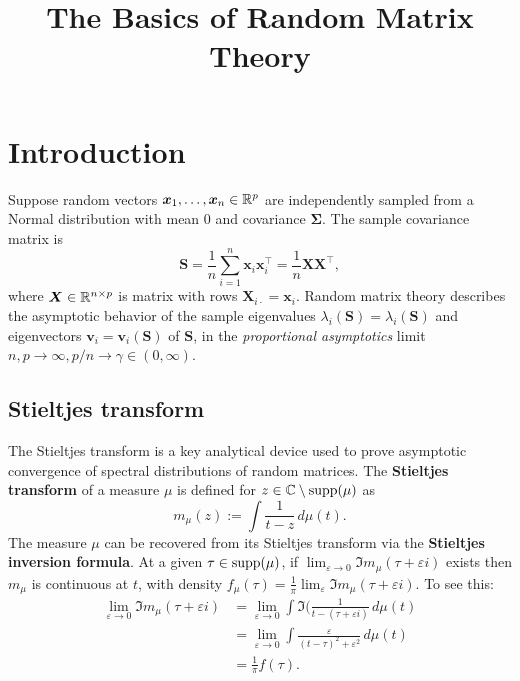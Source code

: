 \documentclass{article}
\title{ {\bf The Basics of Random Matrix Theory} }
\newcommand{\bx}{\boldsymbol{x}}
\newcommand{\bv}{\boldsymbol{v}}
\newcommand{\bX}{\boldsymbol{X}}
\newcommand{\bSigma}{\boldsymbol{\Sigma}}
\newcommand{\bS}{\boldsymbol{S}}
\begin{document}
	
\maketitle
\RaggedRight


\section{Introduction}

Suppose random vectors $\bx_1,\ldots,\bx_n \in \Reals^p$ are independently sampled from a Normal distribution with mean $0$ and covariance $\bSigma$. The sample covariance matrix is
$$
\bS = \frac{1}{n}\sum_{i = 1}^{n} \bx_i \bx_i^{\top} = \frac{1}{n}\bX \bX^{\top},
$$ 
where $\bX \in \Reals^{n \times p}$ is matrix with rows $\bX_{i\cdot} = \bx_i$. Random matrix theory describes the asymptotic behavior of the sample eigenvalues $\lambda_i(\bS) = \lambda_i(\bS)$ and eigenvectors $\bv_i = \bv_i(\bS)$ of $\bS$, in the \emph{proportional asymptotics} limit $n,p \to \infty, p/n \to \gamma \in (0,\infty)$. 

\subsection{Stieltjes transform}
The Stieltjes transform is a key analytical device used to prove asymptotic convergence of spectral distributions of random matrices. The {\bf Stieltjes transform} of a measure $\mu$ is defined for $z \in \mathbb{C}\setminus\mathrm{supp}(\mu)$ as
$$
m_{\mu}(z) := \int \frac{1}{t - z} \,d\mu(t).
$$
The measure $\mu$ can be recovered from its Stieltjes transform via the {\bf Stieltjes inversion formula}. At a given $\tau \in \mathrm{supp}(\mu)$, if $\lim_{\varepsilon \to 0} \Im m_{\mu}(\tau + \varepsilon i)$ exists then $m_{\mu}$ is continuous at $t$, with density $f_{\mu}(\tau) = \frac{1}{\pi}\lim_{\varepsilon} \Im m_{\mu}(\tau + \varepsilon i)$. To see this:
\begin{align*}
	\lim_{\varepsilon \to 0}\Im m_{\mu}(\tau + \varepsilon i) 
	& = 
	\lim_{\varepsilon \to 0}\int \Im(\frac{1}{t - (\tau + \varepsilon i)} \,d\mu(t) \\
	& = \lim_{\varepsilon \to 0} \int \frac{\varepsilon}{(t - \tau)^2 + \varepsilon^2} \,d\mu(t) \\
	& = \frac{1}{\pi}f(\tau).
\end{align*} 
\end{document}
